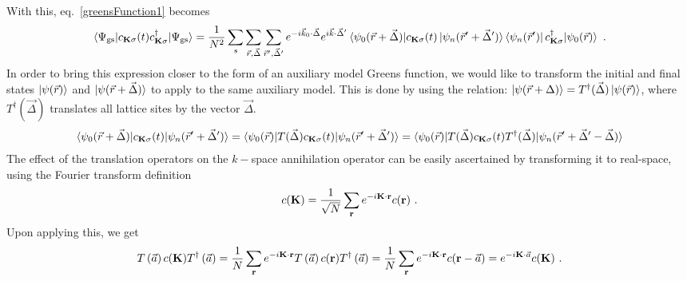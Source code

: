 \documentclass[reprint,hidelinks,onecolumn]{revtex4-2}
\begin{document}
With this, eq.~\ref{greensFunction1} becomes
	\begin{equation}\begin{aligned}\label{greensfunction2}
		\braket{\Psi_\text{gs} | c_{{\bf K}\sigma}(t) c^\dagger_{{\bf K}\sigma} | \Psi_\text{gs}} = \frac{1}{N^2}\sum_s\sum_{\vec r,\vec \Delta}\sum_{\vec r^\prime,\vec \Delta^\prime}e^{-i\vec k_0\cdot\vec\Delta} e^{i\vec k\cdot\vec\Delta^\prime}\braket{\psi_{0}(\vec r+\vec \Delta) | c_{{\bf K}\sigma}(t) \ket{\psi_n(\vec r^\prime+\vec \Delta^\prime)}\bra{\psi_n(\vec r^\prime)} c^\dagger_{{\bf K}\sigma} | \psi_{0}(\vec r)}~.
\end{aligned}\end{equation}
In order to bring this expression closer to the form of an auxiliary model Greens function, we would like to transform the initial and final states \(\ket{\psi(\vec r)}\) and \(\ket{\psi(\vec r + \vec \Delta)}\) to apply to the same auxiliary model. This is done by using the relation: \(\ket{\psi(\vec r + \Delta)} = T^\dagger(\vec \Delta)\ket{\psi(\vec r)}\), where \(T^\dagger(\vec \Delta)\) translates all lattice sites by the vector \(\vec\Delta\).
\begin{equation}\begin{aligned}
	\braket{\psi_{0}(\vec r+\vec \Delta) | c_{{\bf K}\sigma}(t) | \psi_n(\vec r^\prime+\vec \Delta^\prime)} = \braket{\psi_{0}(\vec r) | T(\vec \Delta) c_{{\bf K}\sigma}(t) | \psi_n(\vec r^\prime+\vec \Delta^\prime)} = \braket{\psi_{0}(\vec r) | T(\vec \Delta) c_{{\bf K}\sigma}(t) T^\dagger(\vec \Delta) | \psi_n(\vec r^\prime+\vec \Delta^\prime - \vec \Delta)}
\end{aligned}\end{equation}
The effect of the translation operators on the \(k-\)space annihilation operator can be easily ascertained by transforming it to real-space, using the Fourier transform definition
\begin{equation}\begin{aligned}\label{fourTransf}
	c({\bf K}) = \frac{1}{\sqrt N}\sum_{\bf r}e^{-i{\bf K}\cdot{\bf r}}c({\bf r})~.
\end{aligned}\end{equation}
Upon applying this, we get
\begin{equation}\begin{aligned}\label{translationOnField}
	T\left(\vec a\right) c({\bf K}) T^\dagger\left(\vec a\right) = \frac{1}{N}\sum_{\bf r}e^{-i{\bf K}\cdot{\bf r}}T\left(\vec a\right) c({\bf r}) T^\dagger\left(\vec a\right) = \frac{1}{N}\sum_{\bf r}e^{-i{\bf K}\cdot{\bf r}}c({\bf r} - \vec a) = e^{-i{\bf K}\cdot\vec a}c({\bf K})~.
\end{aligned}\end{equation}
\end{document}
